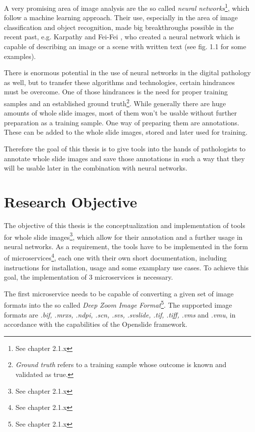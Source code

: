 A very promising area of image analysis are the so called \emph{neural networks}\footnote{See chapter 2.1.x}, which follow a machine learning approach. Their use, especially in the area of image classification and object recognition, made big breakthroughs possible in the recent past, e.g. Karpathy and Fei-Fei \cite{Karpathy15}, who created a neural network which is capable of describing an image or a scene with written text (see fig. 1.1 for some examples).

There is enormous potential in the use of neural networks in the digital pathology as well, but to transfer these algorithms and technologies, certain hindrances must be overcome. One of those hindrances is the need for proper training samples and an established ground truth\footnote{\emph{Ground truth} refers to a training sample whose outcome is known and validated as true.}. While generally there are huge amounts of whole slide images, most of them won't be usable without further preparation as a training sample. One way of preparing them are annotations. These can be added to the whole slide images, stored and later used for training.

Therefore the goal of this thesis is to give tools into the hands of pathologists to annotate whole slide images and save those annotations in such a way that they will be usable later in the combination with neural networks.


\section{Research Objective}

The objective of this thesis is the conceptualization and implementation of tools for whole slide images\footnote{See chapter 2.1.x}, which allow for their annotation and a further usage in neural networks.
As a requirement, the tools have to be implemented in the form of microservices\footnote{See chapter 2.1.x}, each one with their own short documentation, including instructions for installation, usage and some examplary use cases. To achieve this goal, the implementation of 3 microservices is necessary.

The first microservice needs to be capable of converting a given set of image formats into the so called \emph{Deep Zoom Image Format}\footnote{See chapter 2.1.x}. The supported image formats are \emph{.bif, .mrxs, .ndpi, .scn, .svs, .svslide, .tif, .tiff, .vms} and \emph{.vmu}, in accordance with the capabilities of the Openslide framework\cite{Goode13}.

